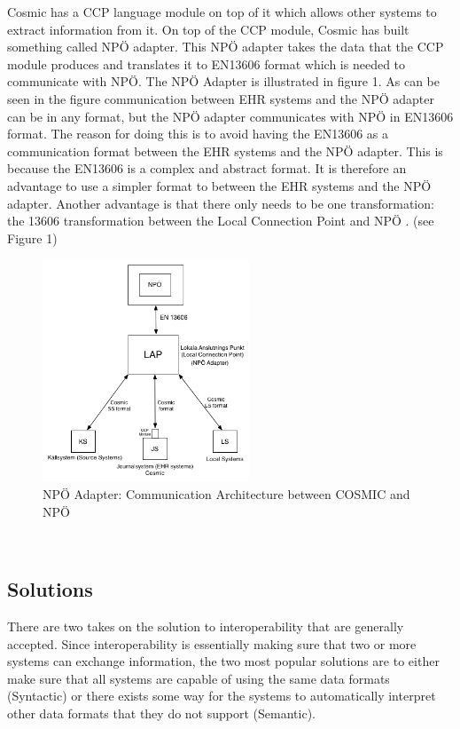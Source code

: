 \documentclass[14pt]{article}
\begin{document}
Cosmic has a CCP language module on top of it which allows other systems to extract information from it. On top of the CCP module, Cosmic has built something called NPÖ adapter. This NPÖ adapter takes the data that the CCP module produces and translates it to \gls{EN13606} format which is needed to communicate with NPÖ. The NPÖ Adapter is illustrated in figure 1. As can be seen in the figure communication between \gls{EHR} systems and the NPÖ adapter can be in any format, but the NPÖ adapter communicates with NPÖ in \gls{EN13606} format. The reason for doing this is to avoid having the \gls{EN13606} as a communication format between the \gls{EHR} systems and the NPÖ adapter. This is because the \gls{EN13606} is a complex and abstract format. It is therefore an advantage to use a simpler format to between the \gls{EHR} systems and the NPÖ adapter. Another advantage is that there only needs to be one transformation: the 13606 transformation between the Local Connection Point and NPÖ  \cite{ViktorJernelov}. (see Figure 1) 

\begin{figure}[h!]
  \caption{NPÖ Adapter: Communication Architecture between COSMIC and NPÖ}
  \centering
    \includegraphics[width=0.55\textwidth]{Images/npoNewAdapt}
\end{figure}\
\label{sec:npoIntervi}

\subsection{Solutions}
\label{sec:interopSolutions}
There are two takes on the solution to interoperability that are generally accepted.  Since interoperability is essentially making sure that two or more systems can exchange information, the two most popular solutions are to either make sure that all systems are capable of using the same data formats (Syntactic) or there exists some way for the systems to automatically interpret other data formats that they do not support (Semantic).
\end{document}
